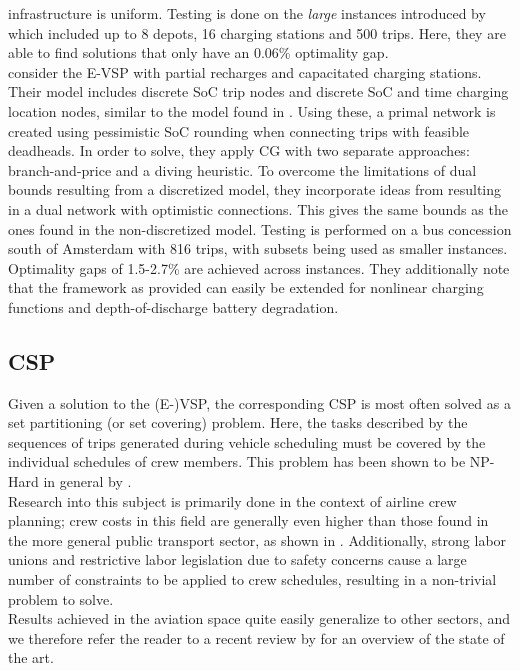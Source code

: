 \documentclass[]{article}
\begin{document}
infrastructure is uniform. Testing is done on the \textit{large}
instances introduced by \citet{Wen2016} which included up to 8
depots, 16 charging stations and 500 trips. Here, they are able to find
solutions that only have an 0.06\% optimality gap. \\
 consider the E-VSP with partial recharges and capacitated charging stations. Their model includes discrete SoC trip nodes and discrete SoC and time charging location nodes, similar to the model found in \citet{Zhang2021}. Using these, a primal network is created using pessimistic SoC rounding when connecting trips with feasible deadheads. In order to solve, they apply CG with two separate approaches:
branch-and-price and a diving heuristic. To overcome the limitations of dual
bounds resulting from a discretized model, they incorporate ideas from \citet{Boland2017} resulting in a dual network with optimistic connections. This gives the same bounds as the ones found in the
non-discretized model. Testing is performed on a bus concession south of
Amsterdam with 816 trips, with subsets being used as smaller instances.
Optimality gaps of 1.5-2.7\% are achieved across instances. They additionally
note that the framework as provided can easily be extended for nonlinear
charging functions and depth-of-discharge battery degradation. 

\subsection{CSP}
Given a solution to the (E-)VSP, the corresponding CSP is most often solved as a set partitioning (or set covering) problem. Here, the tasks described by the sequences of trips generated during vehicle scheduling must be covered by the individual schedules of crew members. This problem has been shown to be NP-Hard in general by \citet{Fischetti1989}.\\
Research into this subject is primarily done in the context of airline crew planning; crew costs in this field are generally even higher than those found in the more general public transport sector, as shown in \citet{Barnhart2003}. Additionally, strong labor unions and restrictive labor legislation due to safety concerns cause a large number of constraints to be applied to crew schedules, resulting in a non-trivial problem to solve. \\
Results achieved in the aviation space quite easily generalize to other sectors, and we therefore refer the reader to a recent review by \citet{Deveci2018} for an overview of the state of the art. 
\end{document}
